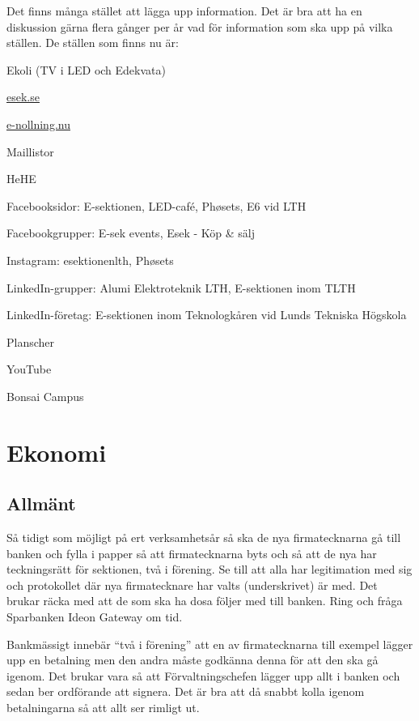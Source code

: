 \documentclass[10pt]{article}
\begin{document}
    Det finns många stället att lägga upp information. Det är bra att ha en diskussion gärna flera gånger per år vad för information som ska upp på vilka ställen. De ställen som finns nu är:
    
    \begin{dashlist}
        \item Ekoli (TV i LED och Edekvata)
        \item \url{esek.se}
        \item \url{e-nollning.nu}
        \item Maillistor
        \item HeHE
        \item Facebooksidor: E-sektionen, LED-café, Ph\o sets, E6 vid LTH
        \item Facebookgrupper: E-sek events, Esek - Köp \& sälj
        \item Instagram: esektionenlth, Ph\o sets
        \item LinkedIn-grupper: Alumi Elektroteknik LTH, E-sektionen inom TLTH
        \item LinkedIn-företag: E-sektionen inom Teknologkåren vid Lunds Tekniska Högskola
        \item Planscher
        \item YouTube
        \item Bonsai Campus
    \end{dashlist}
    
    \section{Ekonomi}
    
    \subsection{Allmänt}
    
    Så tidigt som möjligt på ert verksamhetsår så ska de nya firmatecknarna gå till banken och fylla i papper så att firmatecknarna byts och så att de nya har teckningsrätt för sektionen, två i förening. Se till att alla har legitimation med sig och protokollet där nya firmatecknare har valts (underskrivet) är med. Det brukar räcka med att de som ska ha dosa följer med till banken. Ring och fråga Sparbanken Ideon Gateway om tid.
    
    Bankmässigt innebär ``två i förening'' att en av firmatecknarna till exempel lägger upp en betalning men den andra måste godkänna denna för att den ska gå igenom. Det brukar vara så att Förvaltningschefen lägger upp allt i banken och sedan ber ordförande att signera. Det är bra att då snabbt kolla igenom betalningarna så att allt ser rimligt ut.
    
\end{document}
